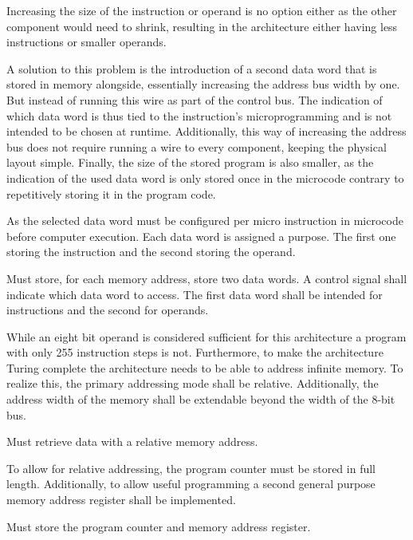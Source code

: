 Increasing the size of the instruction or operand is no option either as the other component would need to shrink, resulting in the architecture either having less instructions or smaller operands.

A solution to this problem is the introduction of a second data word that is stored in memory alongside, essentially increasing the address bus width by one. But instead of running this wire as part of the control bus. The indication of which data word is thus tied to the instruction's microprogramming and is not intended to be chosen at runtime. Additionally, this way of increasing the address bus does not require running a wire to every component, keeping the physical layout simple. Finally, the size of the stored program is also smaller, as the indication of the used data word is only stored once in the microcode contrary to repetitively storing it in the program code.  

As the selected data word must be configured per micro instruction in microcode before computer execution. Each data word is assigned a purpose. The first one storing the instruction and the second storing the operand.    

\begin{feat-requirement}
Must store, for each memory address, store two data words. A control signal shall indicate which data word to access. The first data word shall be intended for instructions and the second for operands.
\end{feat-requirement}

While an eight bit operand is considered sufficient for this architecture a program with only 255 instruction steps is not. Furthermore, to make the architecture Turing complete the architecture needs to be able to address infinite memory. To realize this, the primary addressing mode shall be relative. Additionally, the address width of the memory shall be extendable beyond the width of the 8-bit bus.

\begin{feat-requirement}
Must retrieve data with a relative memory address. 
\end{feat-requirement}

To allow for relative addressing, the program counter must be stored in full length. Additionally, to allow useful programming a second general purpose memory address register shall be implemented. %

\begin{feat-requirement}
Must store the program counter and memory address register.
\end{feat-requirement}

